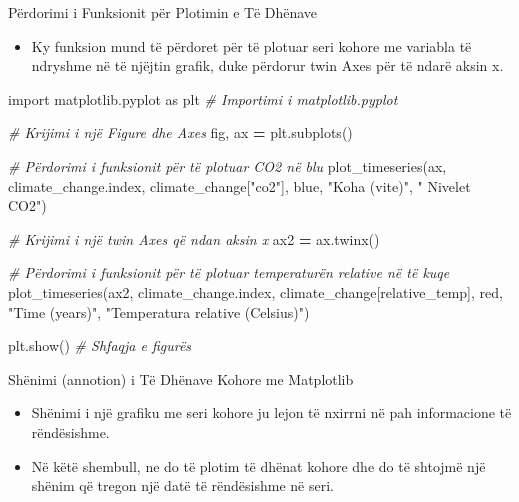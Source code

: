 \documentclass[
  ignorenonframetext,
]{beamer}
\newenvironment{Shaded}{\begin{snugshade}}{\end{snugshade}}
\newcommand{\CommentTok}[1]{\textcolor[rgb]{0.56,0.35,0.01}{\textit{#1}}}
\newcommand{\ImportTok}[1]{#1}
\newcommand{\NormalTok}[1]{#1}
\newcommand{\OperatorTok}[1]{\textcolor[rgb]{0.81,0.36,0.00}{\textbf{#1}}}
\newcommand{\StringTok}[1]{\textcolor[rgb]{0.31,0.60,0.02}{#1}}
\providecommand{\tightlist}{%
  \setlength{\itemsep}{0pt}\setlength{\parskip}{0pt}}
\begin{document}
\begin{frame}[fragile]{Përdorimi i Funksionit për Plotimin e Të Dhënave}
\protect\hypertarget{puxebrdorimi-i-funksionit-puxebr-plotimin-e-tuxeb-dhuxebnave}{}
\begin{itemize}
\tightlist
\item
  Ky funksion mund të përdoret për të plotuar seri kohore me variabla të
  ndryshme në të njëjtin grafik, duke përdorur twin Axes për të ndarë
  aksin x.
\end{itemize}


\begin{Shaded}
\begin{Highlighting}[]
\ImportTok{import}\NormalTok{ matplotlib.pyplot }\ImportTok{as}\NormalTok{ plt  }\CommentTok{\# Importimi i matplotlib.pyplot}

\CommentTok{\# Krijimi i një Figure dhe Axes}
\NormalTok{fig, ax }\OperatorTok{=}\NormalTok{ plt.subplots()}

\CommentTok{\# Përdorimi i funksionit për të plotuar CO2 në blu}
\NormalTok{plot\_timeseries(ax, climate\_change.index, climate\_change[}\StringTok{"co2"}\NormalTok{], }\StringTok{\textquotesingle{}blue\textquotesingle{}}\NormalTok{, }\StringTok{"Koha (vite)"}\NormalTok{, }\StringTok{" Nivelet CO2"}\NormalTok{)}

\CommentTok{\# Krijimi i një twin Axes që ndan aksin x}
\NormalTok{ax2 }\OperatorTok{=}\NormalTok{ ax.twinx()}

\CommentTok{\# Përdorimi i funksionit për të plotuar temperaturën relative në të kuqe}
\NormalTok{plot\_timeseries(ax2, climate\_change.index, climate\_change[}\StringTok{\textquotesingle{}relative\_temp\textquotesingle{}}\NormalTok{], }\StringTok{\textquotesingle{}red\textquotesingle{}}\NormalTok{, }\StringTok{"Time (years)"}\NormalTok{, }\StringTok{"Temperatura relative (Celsius)"}\NormalTok{)}

\NormalTok{plt.show()  }\CommentTok{\# Shfaqja e figurës}
\end{Highlighting}
\end{Shaded}
\end{frame}

\begin{frame}{Shënimi (annotion) i Të Dhënave Kohore me Matplotlib}
\protect\hypertarget{shuxebnimi-annotion-i-tuxeb-dhuxebnave-kohore-me-matplotlib}{}
\begin{itemize}
\item
  Shënimi i një grafiku me seri kohore ju lejon të nxirrni në pah
  informacione të rëndësishme.
\item
  Në këtë shembull, ne do të plotim të dhënat kohore dhe do të shtojmë
  një shënim që tregon një datë të rëndësishme në seri.
\end{itemize}
\end{frame}
\end{document}
